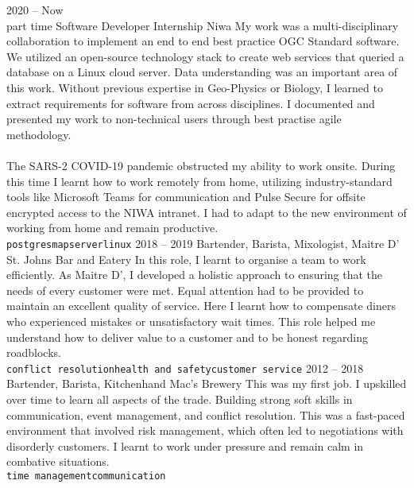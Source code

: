 \documentclass[9pt]{developercv}
\begin{document}
\begin{entrylist}
	\entry
		{2020 -- Now\\\footnotesize{part time}}
		{Software Developer Internship}
		{Niwa}
		{
			My work was a multi-disciplinary collaboration to implement an end to end best practice OGC Standard software. We utilized an open-source technology stack to create web services that queried a database on a Linux cloud server. Data understanding was an important area of this work. Without previous expertise in Geo-Physics or Biology, I learned to extract requirements for software from across disciplines. I documented and presented my work to non-technical users through best practise agile methodology.
			\\\\
			The SARS-2 COVID-19 pandemic obstructed my ability to work onsite. During this time I learnt how to work remotely from home, utilizing industry-standard tools like Microsoft Teams for communication and Pulse Secure for offsite encrypted access to the NIWA intranet. I had to adapt to the new environment of working from home and remain productive.
			\\
			\texttt{postgres}\slashsep\texttt{mapserver}\slashsep\texttt{linux}
		}
	\entry
		{2018 -- 2019}
		{Bartender, Barista, Mixologist, Maitre D'}
		{St. Johns Bar and Eatery}
		{
			In this role, I learnt to organise a team to work efficiently. As Maitre D', I developed a holistic approach to ensuring that the needs of every customer were met. Equal attention had to be provided to maintain an excellent quality of service. Here I learnt how to compensate diners who experienced mistakes or unsatisfactory wait times. This role helped me understand how to deliver value to a customer and to be honest regarding roadblocks.
			\\
			\texttt{conflict resolution}\slashsep\texttt{health and safety}\slashsep\texttt{customer service}
		}
	\entry
		{2012 -- 2018}
		{Bartender, Barista, Kitchenhand}
		{Mac's Brewery}
		{
			This was my first job. I upskilled over time to learn all aspects of the trade. Building strong soft skills in communication, event management, and conflict resolution. This was a fast-paced environment that involved risk management, which often led to negotiations with disorderly customers. I learnt to work under pressure and remain calm in combative situations.
			\\
			\texttt{time management}\slashsep\texttt{communication}
		}
\end{entrylist}
\end{document}
